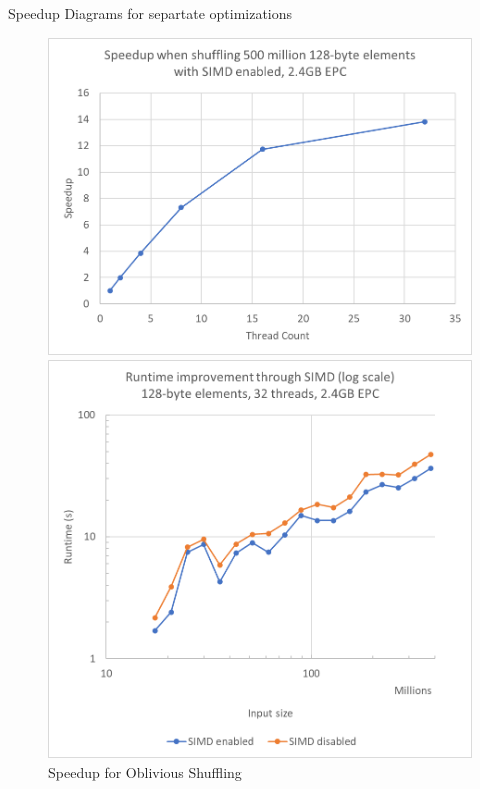 \documentclass[final,hyperref={pdfpagelabels=false}]{beamer}
\begin{document}
\begin{frame}
\begin{columns}[t]
\begin{column}{.30\linewidth}
    \begin{block}{Speedup Diagrams for separtate optimizations}
    \end{block}
    \begin{figure}[h]
        \centering
        \begin{minipage}{0.48\linewidth}
            \includegraphics[width=\linewidth]{assets/speedup_shuffle.png}
            \caption{Speedup for Oblivious Shuffling}
        \end{minipage}
        \hfill
        \begin{minipage}{0.48\linewidth}
            \includegraphics[width=\linewidth]{assets/simd_shuffle.png}

\end{minipage}
\end{figure}
\end{column}
\end{columns}
\end{frame}
\end{document}
